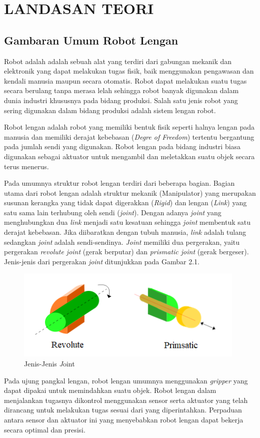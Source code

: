 \chapter{LANDASAN TEORI}

\section{Gambaran Umum Robot Lengan}

Robot adalah adalah sebuah alat yang terdiri dari gabungan mekanik dan elektronik yang dapat melakukan tugas fisik, baik menggunakan pengawasan dan kendali manusia maupun secara otomatis. Robot dapat melakukan suatu tugas secara berulang tanpa merasa lelah sehingga robot banyak digunakan dalam dunia industri khususnya pada bidang produksi. Salah satu jenis robot yang sering digunakan dalam bidang produksi adalah sistem lengan robot.

Robot lengan adalah robot yang memiliki bentuk fisik seperti halnya lengan pada manusia dan memiliki derajat kebebasan (\emph{Degre of Freedom}) tertentu bergantung pada jumlah sendi yang digunakan. Robot lengan pada bidang industri biasa digunakan sebagai aktuator untuk mengambil dan meletakkan suatu objek secara terus menerus.
	

Pada umumnya struktur robot lengan terdiri dari beberapa bagian.  Bagian utama dari robot lengan adalah struktur mekanik ({Manipulator}) yang merupakan susunan kerangka yang tidak dapat digerakkan (\emph{Rigid}) dan lengan (\emph{Link}) yang satu sama lain terhubung oleh sendi (\emph {joint}). Dengan adanya \emph{joint} yang menghubungkan dua \emph{link} menjadi satu kesatuan sehingga \emph{joint} membentuk satu derajat kebebasan. Jika diibaratkan dengan tubuh manusia, \emph{link} adalah tulang sedangkan \emph{joint} adalah sendi-sendinya. \emph{Joint} memiliki dua pergerakan, yaitu pergerakan \emph{revolute joint} (gerak berputar) dan \emph{prismatic joint} (gerak bergeser). Jenis-jenis dari pergerakan \emph{joint} ditunjukkan pada Gambar 2.1.

	\begin{figure}[H]
	\centering
	\includegraphics[width=11cm]{gambar/joint.png}
	\caption{Jenis-Jenis \emph Joint}
\end{figure}
Pada ujung pangkal lengan, robot lengan umumnya menggunakan \emph{gripper} yang dapat dipakai untuk memindahkan suatu objek. Robot lengan dalam menjalankan tugasnya dikontrol menggunakan sensor serta aktuator yang telah dirancang untuk melakukan tugas sesuai dari yang diperintahkan. Perpaduan antara sensor dan aktuator ini yang menyebabkan robot lengan dapat bekerja secara optimal dan presisi.

